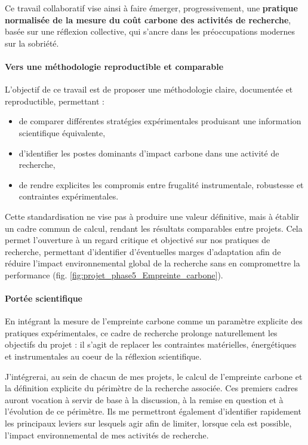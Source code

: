 \documentclass[11pt,a4paper]{article}
\begin{document}
Ce travail collaboratif vise ainsi à faire émerger, progressivement, une \textbf{pratique normalisée de la mesure du coût carbone des activités de recherche}, basée sur une réflexion collective,
qui s'ancre dans les préoccupations modernes sur la sobriété.

\paragraph{Vers une méthodologie reproductible et comparable}

L’objectif de ce travail est de proposer une méthodologie claire, documentée et reproductible, permettant :
\begin{itemize}
    \item de comparer différentes stratégies expérimentales produisant une information scientifique équivalente,
    \item d’identifier les postes dominants d’impact carbone dans une activité de recherche,
    \item de rendre explicites les compromis entre frugalité instrumentale, robustesse et contraintes expérimentales.
\end{itemize} 

Cette standardisation ne vise pas à produire une valeur définitive, mais à établir un cadre commun de calcul, rendant les résultats comparables entre projets.
Cela permet l'ouverture à un regard critique et objectivé sur nos pratiques de recherche, permettant d'identifier d'éventuelles marges d'adaptation afin de réduire l'impact environnemental global de la recherche
sans en compromettre la performance (fig. \ref{fig:projet_phase5_Empreinte_carbone}). 

\paragraph{Portée scientifique}

En intégrant la mesure de l’empreinte carbone comme un paramètre explicite des pratiques expérimentales, ce cadre de recherche prolonge naturellement les objectifs du projet :
il s’agit de replacer les contraintes matérielles, énergétiques et instrumentales au coeur de la réflexion scientifique.

J’intégrerai, au sein de chacun de mes projets, le calcul de l’empreinte carbone et la définition explicite du périmètre de la recherche associée.
Ces premiers cadres auront vocation à servir de base à la discussion, à la remise en question et à l’évolution de ce périmètre.
Ils me permettront également d’identifier rapidement les principaux leviers sur lesquels agir afin de limiter, lorsque cela est possible, l’impact environnemental de mes activités de recherche.
\end{document}
